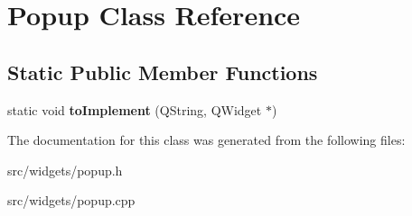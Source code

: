 \hypertarget{classPopup}{\section{Popup Class Reference}
\label{classPopup}
}
\subsection*{Static Public Member Functions}
\begin{DoxyCompactItemize}
\item 
\hypertarget{classPopup_aa3173e0f473b42f08363c4ef17c93a07}{static void {\bfseries to\+Implement} (Q\+String, Q\+Widget $\ast$)}\label{classPopup_aa3173e0f473b42f08363c4ef17c93a07}

\end{DoxyCompactItemize}


The documentation for this class was generated from the following files\+:\begin{DoxyCompactItemize}
\item 
src/widgets/popup.\+h\item 
src/widgets/popup.\+cpp\end{DoxyCompactItemize}
